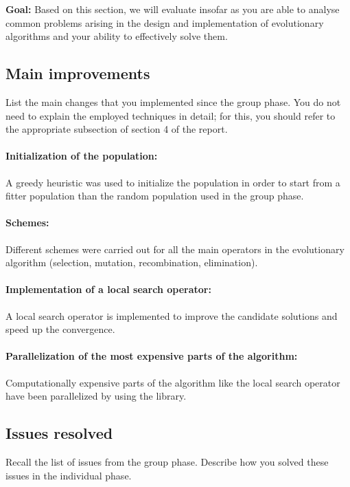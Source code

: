 \documentclass[a4paper,10pt]{article}
\newcommand{\ReplaceMe}[1]{{\color{blue}#1}}
\newcommand{\RemoveMe}[1]{{\color{purple}#1}}
\begin{document}
\RemoveMe{\textbf{Goal:} Based on this section, we will evaluate insofar as you are able to analyse common problems arising in the design and implementation of evolutionary algorithms and your ability to effectively solve them.}

\subsection{Main improvements}

\ReplaceMe{List the main changes that you implemented since the group phase. You do not need to explain the employed techniques in detail; for this, you should refer to the appropriate subsection of section 4 of the report.}

\paragraph{Initialization of the population:}A greedy heuristic was used to initialize the population in order to start from a fitter population than the random population used in the group phase.

\paragraph{Schemes:} Different schemes were carried out for all the main operators in the evolutionary algorithm (selection, mutation, recombination, elimination).

\paragraph{Implementation of a local search operator:} A local search operator is implemented to improve the candidate solutions and speed up the convergence.

\paragraph{Parallelization of the most expensive parts of the algorithm:} Computationally expensive parts of the algorithm like the local search operator have been parallelized by using the  library.


\subsection{Issues resolved}
\ReplaceMe{Recall the list of issues from the group phase. Describe how you solved these issues in the individual phase.}
\end{document}
